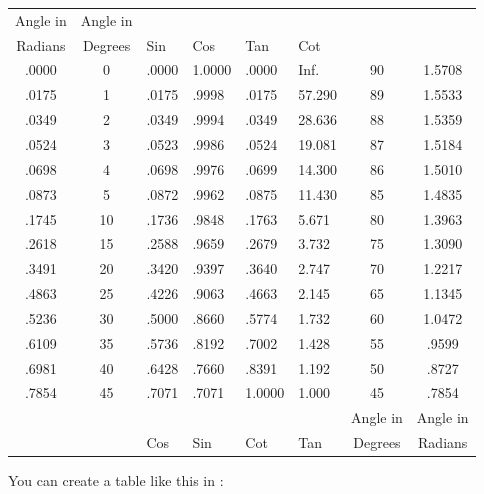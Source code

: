 \begin{center}
\begin{tabular}{ccllllcc}
Angle in & Angle in &        &        &        &        &          &          \\
Radians  & Degrees  &  Sin   &  Cos   & Tan    & Cot    &          &          \\  \hline
.0000    &	0       & .0000  & 1.0000 & .0000  & Inf.   & 90       & 1.5708   \\
.0175    &	1       & .0175  & .9998  & .0175  & 57.290 & 89       & 1.5533   \\
.0349    &	2       & .0349  & .9994  & .0349  & 28.636 & 88       & 1.5359   \\
.0524    &	3       & .0523  & .9986  & .0524  & 19.081 & 87       & 1.5184   \\
.0698    &	4       & .0698  & .9976  & .0699  & 14.300 & 86       & 1.5010   \\
.0873    &	5       & .0872  & .9962  & .0875  & 11.430 & 85       & 1.4835   \\
.1745    &	10      & .1736  & .9848  & .1763  & 5.671  & 80       & 1.3963   \\
.2618    &	15      & .2588  & .9659  & .2679  & 3.732  & 75       & 1.3090   \\
.3491    &	20      & .3420  & .9397  & .3640  & 2.747  & 70       & 1.2217   \\
.4863    &	25      & .4226  & .9063  & .4663  & 2.145  & 65       & 1.1345   \\
.5236    &	30      & .5000  & .8660  & .5774  & 1.732  & 60       & 1.0472   \\
.6109    &	35      & .5736  & .8192  & .7002  & 1.428  & 55       & .9599    \\
.6981    &	40      & .6428  & .7660  & .8391  & 1.192  & 50       &	.8727   \\
.7854    &	45      & .7071  & .7071  & 1.0000 & 1.000  & 45       & .7854    \\  \hline
         &          &        &        &        &        & Angle in & Angle in \\
         &          &  Cos   &  Sin   & Cot    & Tan    & Degrees  & Radians  \\  
\end{tabular}
\end{center}

You can create a table like this in \SAGE :

